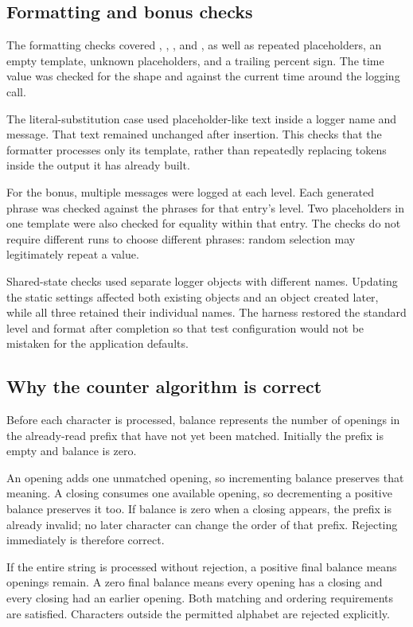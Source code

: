 \subsection{Formatting and bonus checks}
The formatting checks covered , , , and , as well as repeated placeholders, an empty template, unknown placeholders, and a trailing percent sign. The time value was checked for the  shape and against the current time around the logging call.

The literal-substitution case used placeholder-like text inside a logger name and message. That text remained unchanged after insertion. This checks that the formatter processes only its template, rather than repeatedly replacing tokens inside the output it has already built.

For the bonus, multiple messages were logged at each level. Each generated phrase was checked against the phrases for that entry's level. Two  placeholders in one template were also checked for equality within that entry. The checks do not require different runs to choose different phrases: random selection may legitimately repeat a value.

Shared-state checks used separate logger objects with different names. Updating the static settings affected both existing objects and an object created later, while all three retained their individual names. The harness restored the standard level and format after completion so that test configuration would not be mistaken for the application defaults.

\newpage
\subsection{Why the counter algorithm is correct}
Before each character is processed, balance represents the number of openings in the already-read prefix that have not yet been matched. Initially the prefix is empty and balance is zero.

An opening adds one unmatched opening, so incrementing balance preserves that meaning. A closing consumes one available opening, so decrementing a positive balance preserves it too. If balance is zero when a closing appears, the prefix is already invalid; no later character can change the order of that prefix. Rejecting immediately is therefore correct.

If the entire string is processed without rejection, a positive final balance means openings remain. A zero final balance means every opening has a closing and every closing had an earlier opening. Both matching and ordering requirements are satisfied. Characters outside the permitted alphabet are rejected explicitly.

